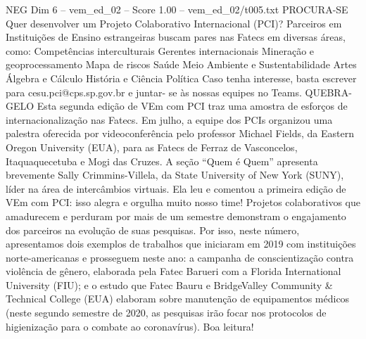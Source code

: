 \begin{textsample}{NEG Dim 6 – vem\_ed\_02 – Score 1.00 – vem\_ed\_02/t005.txt}  \label{ex:f6_neg_055}
PROCURA-SE Quer desenvolver um Projeto Colaborativo Internacional (PCI)?
Parceiros em Instituições de Ensino estrangeiras buscam pares nas Fatecs em diversas áreas, como: Competências interculturais Gerentes internacionais Mineração e geoprocessamento Mapa de riscos Saúde Meio Ambiente e Sustentabilidade Artes Álgebra e Cálculo História e Ciência Política Caso tenha interesse, basta escrever para cesu.pci@cps.sp.gov.br e juntar- se às nossas equipes no Teams.
QUEBRA-GELO Esta segunda edição de VEm com PCI traz uma amostra de esforços de internacionalização nas Fatecs.
Em julho, a equipe dos PCIs organizou uma palestra oferecida por videoconferência pelo professor Michael Fields, da Eastern Oregon University (EUA), para as Fatecs de Ferraz de Vasconcelos, Itaquaquecetuba e Mogi das Cruzes.
A seção “Quem é Quem” apresenta brevemente Sally Crimmins-Villela, da State University of New York (SUNY), líder na área de intercâmbios virtuais.
Ela leu e comentou a primeira edição de VEm com PCI: isso alegra e orgulha muito nosso time!
Projetos colaborativos que amadurecem e perduram por mais de um semestre demonstram o engajamento dos parceiros na evolução de suas pesquisas.
Por isso, neste número, apresentamos dois exemplos de trabalhos que iniciaram em 2019 com instituições norte-americanas e prosseguem neste ano: a campanha de conscientização contra violência de gênero, elaborada pela Fatec Barueri com a Florida International University (FIU); e o estudo que Fatec Bauru e BridgeValley Community \& Technical College (EUA) elaboram sobre manutenção de equipamentos médicos (neste segundo semestre de 2020, as pesquisas irão focar nos protocolos de higienização para o combate ao coronavírus).
Boa leitura!

\end{textsample}
